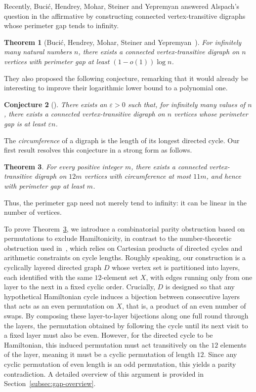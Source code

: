 \documentclass[11pt,a4paper,reqno]{amsart}
\newtheorem{theorem}{Theorem}[section]
\newtheorem{conjecture}[theorem]{Conjecture}
\theoremstyle{definition}
\theoremstyle{remark}
\numberwithin{equation}{section}
\newcommand{\eps}{\varepsilon}
\begin{document}
Recently, Buci\'c, Hendrey, Mohar, Steiner and Yepremyan answered Alspach's question in the affirmative by constructing connected vertex-transitive digraphs whose perimeter gap tends to infinity.
\begin{theorem}[Buci\'c, Hendrey, Mohar, Steiner and Yepremyan~\cite{BHMSY}]
For infinitely many natural numbers $n$, there exists a connected vertex-transitive digraph on $n$ vertices with perimeter gap at least $(1-o(1))\log n$.
\end{theorem}

They also proposed the following conjecture, remarking that it would already be interesting to improve their logarithmic lower bound to a polynomial one.
\begin{conjecture}[{\cite[Conjecture 4.1]{BHMSY}}]
There exists an $\eps>0$ such that, for infinitely many values of $n$, there exists a connected vertex-transitive digraph on $n$ vertices whose perimeter gap is at least $\eps n$.
\end{conjecture}

The \emph{circumference} of a digraph is the length of its longest directed cycle. Our first result resolves this conjecture in a strong form as follows.
\begin{theorem}\label{thm:gap}
For every positive integer $m$, there exists a connected vertex-transitive digraph on $12m$ vertices with circumference at most $11m$, and hence with perimeter gap at least $m$.
\end{theorem}

Thus, the perimeter gap need not merely tend to infinity: it can be linear in the number of vertices.

To prove Theorem~\ref{thm:gap}, we introduce a combinatorial parity obstruction based on permutations to exclude Hamiltonicity, in contrast to the number-theoretic obstruction used in~\cite{BHMSY}, which relies on Cartesian products of directed cycles and arithmetic constraints on cycle lengths. Roughly speaking, our construction is a cyclically layered directed graph $D$ whose vertex set is partitioned into layers, each identified with the same $12$-element set $X$, with edges running only from one layer to the next in a fixed cyclic order. Crucially, $D$ is designed so that any hypothetical Hamiltonian cycle induces a bijection between consecutive layers that acts as an even permutation on $X$, that is, a product of an even number of swaps. By composing these layer-to-layer bijections along one full round through the layers, the permutation obtained by following the cycle until its next visit to a fixed layer must also be even. However, for the directed cycle to be Hamiltonian, this induced permutation must act transitively on the $12$ elements of the layer, meaning it must be a cyclic permutation of length $12$. Since any cyclic permutation of even length is an odd permutation, this yields a parity contradiction. A detailed overview of this argument is provided in Section~\ref{subsec:gap-overview}.
\end{document}

